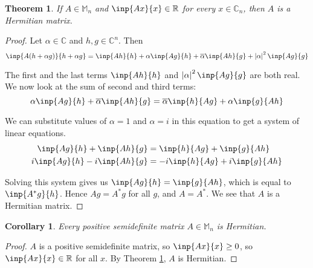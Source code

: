 \documentclass[twofold]{article}
\newcommand*\conj[1]{\overline{#1}}
\newcommand*\adj[1]{#1^*}
\newcommand*\abs[1]{\left \vert #1 \right\vert}
\theoremstyle{plain}
\newtheorem{theorem}{Theorem}
\newtheorem*{corollary}{Corollary}
\theoremstyle{definition}
\theoremstyle{remark}
\begin{document}
\begin{theorem}\label{eig_real_herm} If \(A \in \mathbb{M}_n\) and \(\inp{Ax}{x} \in \mathbb{R}\) for every \(x \in \mathbb{C}_n\), then \(A\) is a Hermitian matrix. \end{theorem}

\begin{proof} Let \(\alpha \in \mathbb{C}\) and \(h, g \in \mathbb{C}^n\). Then
\[\inp{A(h + \alpha g)}{h + \alpha g} = \inp{Ah}{h} + \alpha \inp{Ag}{h} + \conj{\alpha} \inp{Ah}{g} + \abs{\alpha}^2 \inp{Ag}{g} \]

The first and the last terms \(\inp{Ah}{h}\) and \(\abs{\alpha}^2 \inp{Ag}{g}\) are both real. We now look at the sum of second and third terms:
\[\alpha \inp{Ag}{h} + \conj{\alpha} \inp{Ah}{g} = \conj{\alpha} \inp{h}{Ag} + \alpha \inp{g}{Ah} \]

We can substitute values of \(\alpha = 1\) and \(\alpha = i\)  in this equation to get a system of linear equations. 
\begin{equation*}
\begin{aligned}
\inp{Ag}{h}  + \inp{Ah}{g} & =  \inp{h}{Ag}  + \inp{g}{Ah} \\
i \inp{Ag}{h}  - i \inp{Ah}{g}  & = -i \inp{h}{Ag} +  i \inp{g}{Ah} 
\end{aligned}
\end{equation*}

Solving this system gives us \(\inp{Ag}{h} = \inp{g}{Ah}\), which is equal to \(\inp{\adj{A}g}{h}\). Hence \(Ag = \adj{A}g\) for all \(g\), and \(A = \adj{A}\). We see that \(A\) is a Hermitian matrix.
\end{proof}

\begin{corollary}Every positive semidefinite matrix \(A \in \mathbb{M}_n\) is Hermitian.\end{corollary}
\begin{proof} \(A\) is a positive semidefinite matrix, so \(\inp{Ax}{x} \ge 0 \),  so \(\inp{Ax}{x} \in \mathbb{R}\) for all \(x\). By Theorem \ref{eig_real_herm}, \(A\) is Hermitian. \end{proof}
\end{document}
